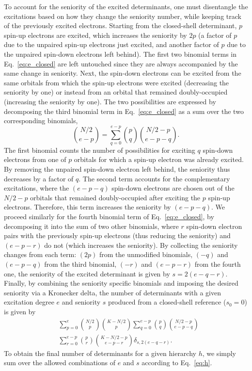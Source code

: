 \documentclass[aip,jcp,reprint,noshowkeys,superscriptaddress]{revtex4-1}
\begin{document}
To account for the seniority of the excited determinants, one must disentangle the excitations based on how they change the seniority number,
while keeping track of the previously excited electrons.
Starting from the closed-shell determinant, $p$ spin-up electrons are excited, which increases the seniority by $2p$
(a factor of $p$ due to the unpaired spin-up electrons just excited,
and another factor of $p$ due to the unpaired spin-down electrons left behind).
The first two binomial terms in Eq.~\eqref{eq:e_closed} are left untouched since they are always accompanied by the same change in seniority.
Next, the spin-down electrons can be excited from the same orbitals from which the spin-up electrons were excited (decreasing the seniority by one)
or instead from an orbital that remained doubly-occupied (increasing the seniority by one).
The two possibilities are expressed by decomposing the third binomial term in Eq.~\eqref{eq:e_closed} as a sum over the two corresponding binomials,
\begin{equation}
	\binom{N/2}{e-p} = \sum_{q=0}^{e-p} \binom{p}{q} \binom{N/2-p}{e-p-q}.
\end{equation}
The first binomial counts the number of possibilities for exciting $q$ spin-down electrons from one of $p$ orbitals for which a spin-up electron was already excited.
By removing the unpaired spin-down electron left behind, the seniority thus decreases by a factor of $q$.
The second term accounts for the complementary excitations, where the $(e-p-q)$ spin-down electrons are chosen out of the $N/2-p$ orbitals that 
remained doubly-occupied after exciting the $p$ spin-up electrons.
Therefore, this term increases the seniority by $(e-p-q)$.
We proceed similarly for the fourth binomial term of Eq.~\eqref{eq:e_closed}, by decomposing it into the sum of two other binomials,
where $r$ spin-down electron pairs with the previously spin-up electrons (thus reducing the seniority) and $(e-p-r)$ do not (which increases the seniority).
By collecting the seniority changes from each term: $(2p)$ from the unmodified binomials, $(-q)$ and $(e-p-q)$ from the third binomial, $(-r)$ and $(e-p-r)$ from the fourth one,
the seniority of the excited determinant is given by $s = 2 (e-q-r)$.
Finally, by combining the seniority specific binomials and imposing the desired seniority via a Kronecker delta,
the number of determinants with a given excitation degree $e$ and seniority $s$ produced from a closed-shell reference ($s_0=0$) is given by
\begin{equation}
\begin{split}
	&\sum_{p=0}^{e} \binom{N/2}{p} \binom{K-N/2}{p}
	\sum_{q=0}^{e-p} \binom{p}{q} \binom{N/2-p}{e-p-q}  \\
	&\sum_{r=0}^{e-p} \binom{p}{r} \binom{K-N/2-p}{e-p-r}
 	\delta_{s,2(e-q-r)}.
\label{eq:det_1}
\end{split}
\end{equation}
To obtain the final number of determinants for a given hierarchy $h$, we simply sum over the allowed combinations of $e$ and $s$ according to Eq.~\eqref{eq:h}.
\end{document}
